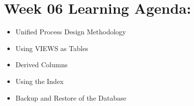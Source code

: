 

\section{Week 06 Learning Agenda:}

\begin{itemize}
    \item Unified Process Design Methodology
    \item Using VIEWS as Tables 
    \item Derived Columns
    \item Using the Index
    \item Backup and Restore of the Database
\end{itemize}    
